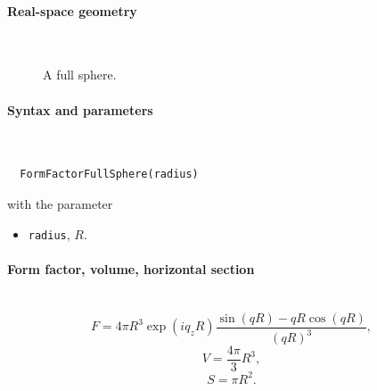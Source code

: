 \paragraph{Real-space geometry}\strut\\

\begin{figure}[H]
\hfill
{}
\hfill
{}
\hfill
{}
\hfill
\caption{A full sphere.}
\end{figure}

\FloatBarrier

\paragraph{Syntax and parameters}\strut\\[-2ex plus .2ex minus .2ex]
\begin{lstlisting}
  FormFactorFullSphere(radius)
\end{lstlisting}
with the parameter
\begin{itemize}
\item \texttt{radius}, $R$.
\end{itemize}

\paragraph{Form factor, volume, horizontal section}\strut\\
\begin{equation*}
F = 4\pi R^3 \exp(iq_z R)\frac{\sin(q R) - q R \cos(q R)}{(qR)^3},
\end{equation*}
\begin{equation*}
  V = \dfrac{4\pi}{3}R^3,
\end{equation*}
\begin{equation*}
  S= \pi R^2.
\end{equation*}

